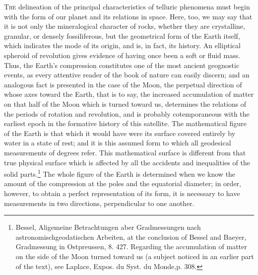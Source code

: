 \lettrine[lines = 4]{\goudy T}{he} delineation of the principal characteristics of telluric phenomena must begin with the form of our planet and its relations in space. Here, too, we may say that it is not only the mineralogical character of rocks, whether they are crystalline, granular, or densely fossiliferous, but the geometrical form of the Earth itself, which indicates the mode of its origin, and is, in fact, its history. An elliptical spheroid of revolution gives evidence of having once been a soft or fluid mass. Thus, the Earth's compression constitutes one of the most ancient geognostic events, as every attentive reader of the book of nature can easily discern; and an analogous fact is presented in the case of the Moon, the perpetual direction of whose axes toward the Earth, that is to say, the increased accumulation of matter on that half of the Moon which is turned toward us, determines the relations of the periods of rotation and revolution, and is probably cotemporaneous with the earliest epoch in the formative history of this satellite. The mathematical figure of the Earth is that which it would have were its surface covered entirely by water in a state of rest; and it is this assumed form to which all geodesical measurements of degrees refer. This mathematical surface is different from that true physical surface which is affected by all the accidents and inequalities of the solid parts.\footnote{Bessel, Aligemeine Betrachtungen aber Gradmessungen nach astronomischgeodatischen Arbeiten, at the conclusion of Bessel and Baeyer, Gradmessung in Ostpreussen, 8. 427. Regarding the accumulation of matter on the side of the Moon turned toward us (a subject noticed in an earlier part of the text), see Laplace, Expos. du Syst. du Monde,p. 308.} The whole figure of the Earth is determined when we know the amount of the compression at the poles and the equatorial diameter; in order, however, to obtain a perfect representation of its form, it is necessary to have measurements in two directions, perpendicular to one another.

